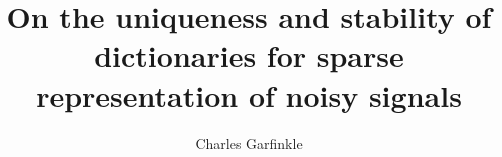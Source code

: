 \documentclass{ucbthesis}
\begin{document}

\title{On the uniqueness and stability of dictionaries for sparse representation of noisy signals}
\author{Charles Garfinkle}


\maketitle
\approvalpage
\copyrightpage


\end{document}
